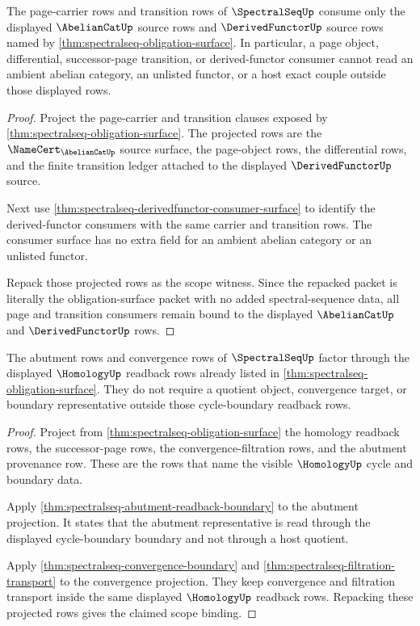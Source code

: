 \begin{theorem}
\label{thm:spectralseq-abcat-derivedfunctor-scope-binding}
The page-carrier rows and transition rows of $\SpectralSeqUp$ consume only the
displayed $\AbelianCatUp$ source rows and $\DerivedFunctorUp$ source rows named
by \autoref{thm:spectralseq-obligation-surface}. In particular, a page object,
differential, successor-page transition, or derived-functor consumer cannot read
an ambient abelian category, an unlisted functor, or a host exact couple outside
those displayed rows.
\end{theorem}
\begin{proof}
Project the page-carrier and transition clauses exposed by
\autoref{thm:spectralseq-obligation-surface}. The projected rows are the
$\NameCert_{\AbelianCatUp}$ source surface, the page-object rows, the
differential rows, and the finite transition ledger attached to the displayed
$\DerivedFunctorUp$ source.

Next use \autoref{thm:spectralseq-derivedfunctor-consumer-surface} to identify
the derived-functor consumers with the same carrier and transition rows. The
consumer surface has no extra field for an ambient abelian category or an
unlisted functor.

Repack those projected rows as the scope witness. Since the repacked packet is
literally the obligation-surface packet with no added spectral-sequence data, all
page and transition consumers remain bound to the displayed
$\AbelianCatUp$ and $\DerivedFunctorUp$ rows.
\end{proof}

\begin{theorem}
\label{thm:spectralseq-homology-readback-scope-binding}
The abutment rows and convergence rows of $\SpectralSeqUp$ factor through the
displayed $\HomologyUp$ readback rows already listed in
\autoref{thm:spectralseq-obligation-surface}. They do not require a quotient
object, convergence target, or boundary representative outside those
cycle-boundary readback rows.
\end{theorem}
\begin{proof}
Project from \autoref{thm:spectralseq-obligation-surface} the homology readback
rows, the successor-page rows, the convergence-filtration rows, and the
abutment provenance row. These are the rows that name the visible
$\HomologyUp$ cycle and boundary data.

Apply \autoref{thm:spectralseq-abutment-readback-boundary} to the abutment
projection. It states that the abutment representative is read through the
displayed cycle-boundary boundary and not through a host quotient.

Apply \autoref{thm:spectralseq-convergence-boundary} and
\autoref{thm:spectralseq-filtration-transport} to the convergence projection.
They keep convergence and filtration transport inside the same displayed
$\HomologyUp$ readback rows. Repacking these projected rows gives the claimed
scope binding.
\end{proof}

